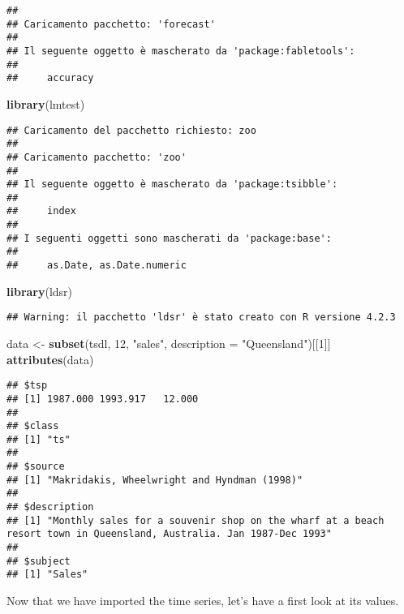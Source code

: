 \documentclass[
]{article}
\newenvironment{Shaded}{\begin{snugshade}}{\end{snugshade}}
\newcommand{\AttributeTok}[1]{\textcolor[rgb]{0.13,0.29,0.53}{#1}}
\newcommand{\DecValTok}[1]{\textcolor[rgb]{0.00,0.00,0.81}{#1}}
\newcommand{\FunctionTok}[1]{\textcolor[rgb]{0.13,0.29,0.53}{\textbf{#1}}}
\newcommand{\NormalTok}[1]{#1}
\newcommand{\OtherTok}[1]{\textcolor[rgb]{0.56,0.35,0.01}{#1}}
\newcommand{\StringTok}[1]{\textcolor[rgb]{0.31,0.60,0.02}{#1}}
\begin{document}
\begin{verbatim}
## 
## Caricamento pacchetto: 'forecast'
## 
## Il seguente oggetto è mascherato da 'package:fabletools':
## 
##     accuracy
\end{verbatim}

\begin{Shaded}
\begin{Highlighting}[]
\FunctionTok{library}\NormalTok{(lmtest)}
\end{Highlighting}
\end{Shaded}

\begin{verbatim}
## Caricamento del pacchetto richiesto: zoo
## 
## Caricamento pacchetto: 'zoo'
## 
## Il seguente oggetto è mascherato da 'package:tsibble':
## 
##     index
## 
## I seguenti oggetti sono mascherati da 'package:base':
## 
##     as.Date, as.Date.numeric
\end{verbatim}

\begin{Shaded}
\begin{Highlighting}[]
\FunctionTok{library}\NormalTok{(ldsr)}
\end{Highlighting}
\end{Shaded}

\begin{verbatim}
## Warning: il pacchetto 'ldsr' è stato creato con R versione 4.2.3
\end{verbatim}

\begin{Shaded}
\begin{Highlighting}[]
\NormalTok{data }\OtherTok{\textless{}{-}} \FunctionTok{subset}\NormalTok{(tsdl, }\DecValTok{12}\NormalTok{, }\StringTok{"sales"}\NormalTok{, }\AttributeTok{description =} \StringTok{"Queensland"}\NormalTok{)[[}\DecValTok{1}\NormalTok{]]}
\FunctionTok{attributes}\NormalTok{(data)}
\end{Highlighting}
\end{Shaded}

\begin{verbatim}
## $tsp
## [1] 1987.000 1993.917   12.000
## 
## $class
## [1] "ts"
## 
## $source
## [1] "Makridakis, Wheelwright and Hyndman (1998)"
## 
## $description
## [1] "Monthly sales for a souvenir shop on the wharf at a beach resort town in Queensland, Australia. Jan 1987-Dec 1993"
## 
## $subject
## [1] "Sales"
\end{verbatim}

Now that we have imported the time series, let's have a first look at
its values.
\end{document}
